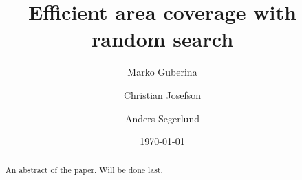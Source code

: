 \documentclass[%
aps,
draft, %
jmp,
 jor,
 amsmath,amssymb,
 reprint,%
]{revtex4-2}
\begin{document}
\title[Sample title]{Efficient area coverage with random search}%


\author{Marko Guberina}
\author{Christian Josefson}%

\author{Anders Segerlund}
%


\date{\today}%

\begin{abstract}
An abstract of the paper. Will be done last.
%
\listoftodos
\end{abstract}

\maketitle














\end{document}
